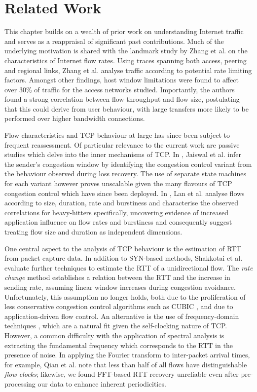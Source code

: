 \section{Related Work}
\label{section:malawi:related}

This chapter builds on a wealth of prior work on understanding Internet traffic and serves as a reappraisal of significant past contributions. 
Much of the underlying motivation is shared with the landmark study by Zhang et al. \cite{Zhang:2002p85} on the characteristics of Internet flow rates.
Using traces spanning both access, peering and regional links, Zhang et al. analyse traffic according to potential rate limiting factors.
Amongst other findings, host window limitations were found to affect over 30\% of traffic for the access networks studied.
Importantly, the authors found a strong correlation between flow throughput and flow size, postulating that this could derive from user behaviour, with large transfers more likely to be performed over higher bandwidth connections.

Flow characteristics and TCP behaviour at large has since been subject to frequent reassessment.
Of particular relevance to the current work are passive studies which delve into the inner mechanisms of TCP.
In \cite{Jaiswal:2004p242}, Jaiswal et al. infer the sender's congestion window by identifying the congestion control variant from the behaviour observed during loss recovery.
The use of separate state machines for each variant however proves unscalable given the many flavours of TCP congestion control which have since been deployed.
In \cite{Lan:2006p566}, Lan et al. analyse flows according to size, duration, rate and burstiness and characterise the observed correlations for heavy-hitters specifically,
uncovering evidence of increased application influence on flow rates and burstiness and consequently suggest treating flow size and duration as independent dimensions.

One central aspect to the analysis of TCP behaviour is the estimation of RTT from packet capture data. In addition to SYN-based methods, Shakkotai et al. \cite{Shakkottai:2004p408} evaluate further techniques to estimate the RTT of a unidirectional flow. The \textit{rate change} method establishes a relation between the RTT and the increase in sending rate, assuming linear window increases during congestion avoidance. Unfortunately, this assumption no longer holds, both due to the proliferation of less conservative congestion control algorithms such as CUBIC \cite{Ha:2008p471}, and due to application-driven flow control. An alternative is the use of frequency-domain techniques \cite{Veal:2005p412,Lance:2005p565,Qian:2009p429}, which are a natural fit given the self-clocking nature of TCP. However, a common difficulty with the application of spectral analysis is extracting the fundamental frequency which corresponds to the RTT in the presence of noise. In applying the Fourier transform to inter-packet arrival 
times, for example, Qian et al. \cite{Qian:2009p429} note that less than half of all flows have distinguishable \textit{flow clocks}; likewise, we found FFT-based RTT recovery unreliable even after pre-processing our data to enhance inherent periodicities.

